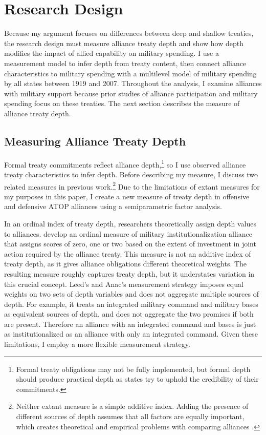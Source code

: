 \documentclass[12pt]{article}
\begin{document}
\section{Research Design} 


Because my argument focuses on differences between deep and shallow treaties, the research design must measure alliance treaty depth and show how depth modifies the impact of allied capability on military spending.  
I use a measurement model to infer depth from treaty content, then connect alliance characteristics to military spending with a multilevel model of military spending by all states between 1919 and 2007. 
Throughout the analysis, I examine alliances with military support because prior studies of alliance participation and military spending focus on these treaties.
The next section describes the measure of alliance treaty depth. 


\subsection{Measuring Alliance Treaty Depth} 


Formal treaty commitments reflect alliance depth,\footnote{Formal treaty obligations may not be fully implemented, but formal depth should produce practical depth as states try to uphold the credibility of their commitments.} so I use observed alliance treaty characteristics to infer depth. 
Before describing my measure, I discuss two related measures in previous work.\footnote{Neither extant measure is a simple additive index. Adding the presence of different sources of depth assumes that all factors are equally important, which creates theoretical and empirical problems with comparing alliances \citep[pg. 876]{BensonClinton2016}.} 
Due to the limitations of extant measures for my purposes in this paper, I create a new measure of treaty depth in offensive and defensive ATOP alliances using a semiparametric factor analysis. 


In an ordinal index of treaty depth, researchers theoretically assign depth values to alliances. 
\citep{LeedsAnac2005} develop an ordinal measure of military institutionalization alliance that assigns scores of zero, one or two based on the extent of investment in joint action required by the alliance treaty. 
This measure is not an additive index of treaty depth, as it gives alliance obligations different theoretical weights.  
The resulting measure roughly captures treaty depth, but it understates variation in this crucial concept. 
Leed's and Anac's measurement strategy imposes equal weights on two sets of depth variables and does not aggregate multiple sources of depth. 
For example, it treats an integrated military command and military bases as equivalent sources of depth, and does not aggregate the two promises if both are present. 
Therefore an alliance with an integrated command and bases is just as institutionalized as an alliance with only an integrated command. 
Given these limitations, I employ a more flexible measurement strategy.
\end{document}
